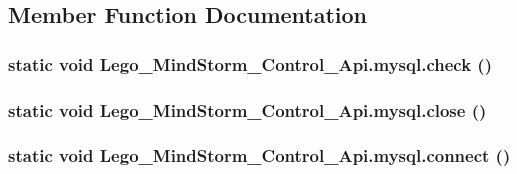 \subsection{Member Function Documentation}
\hypertarget{class_lego___mind_storm___control___api_1_1mysql_c8132164866e3aff6dd941913f7ea0de}{
\subsubsection[{check}]{\setlength{\rightskip}{0pt plus 5cm}static void Lego\_\-MindStorm\_\-Control\_\-Api.mysql.check ()}}
\label{class_lego___mind_storm___control___api_1_1mysql_c8132164866e3aff6dd941913f7ea0de}


\hypertarget{class_lego___mind_storm___control___api_1_1mysql_fb55eb4f6dc95ad8fead2a77e912331e}{
\subsubsection[{close}]{\setlength{\rightskip}{0pt plus 5cm}static void Lego\_\-MindStorm\_\-Control\_\-Api.mysql.close ()}}
\label{class_lego___mind_storm___control___api_1_1mysql_fb55eb4f6dc95ad8fead2a77e912331e}


\hypertarget{class_lego___mind_storm___control___api_1_1mysql_eaec7fca363869adc8cbbfa36c4952ba}{
\subsubsection[{connect}]{\setlength{\rightskip}{0pt plus 5cm}static void Lego\_\-MindStorm\_\-Control\_\-Api.mysql.connect ()}}
\label{class_lego___mind_storm___control___api_1_1mysql_eaec7fca363869adc8cbbfa36c4952ba}


